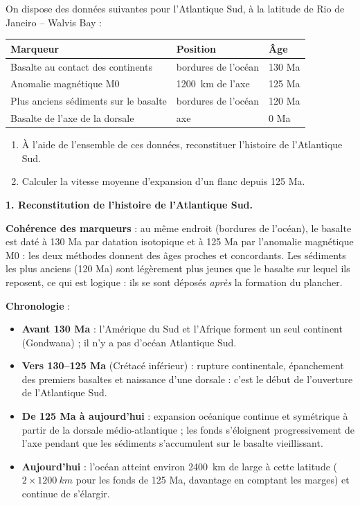 \documentclass[11pt]{article}
\newcommand{\cle}[1]{{\popxbold\color{popdark}#1}}
\begin{document}
\begin{exoresolu}
On dispose des données suivantes pour l'Atlantique Sud, à la latitude de Rio de Janeiro -- Walvis Bay :

\begin{center}
\begin{tabularx}{\linewidth}{|l|X|X|}
\hline
\rowcolor{popblueL} \textbf{Marqueur} & \textbf{Position} & \textbf{Âge} \\
\hline
Basalte au contact des continents & bordures de l'océan & 130 Ma \\
\hline
Anomalie magnétique M0 & \SI{1200}{km} de l'axe & 125 Ma \\
\hline
Plus anciens sédiments sur le basalte & bordures de l'océan & 120 Ma \\
\hline
Basalte de l'axe de la dorsale & axe & 0 Ma \\
\hline
\end{tabularx}
\end{center}

\begin{enumerate}
\item À l'aide de l'ensemble de ces données, reconstituer l'histoire de l'Atlantique Sud.
\item Calculer la vitesse moyenne d'expansion d'un flanc depuis 125 Ma.
\end{enumerate}
\tcblower
\textbf{1. Reconstitution de l'histoire de l'Atlantique Sud.}

\textbf{Cohérence des marqueurs} : au même endroit (bordures de l'océan), le basalte est daté à 130 Ma par datation isotopique et à 125 Ma par l'anomalie magnétique M0 : les deux méthodes donnent des âges proches et concordants. Les sédiments les plus anciens (120 Ma) sont légèrement plus jeunes que le basalte sur lequel ils reposent, ce qui est logique : ils se sont déposés \emph{après} la formation du plancher.

\textbf{Chronologie} :
\begin{itemize}
\item \textbf{Avant 130 Ma} : l'Amérique du Sud et l'Afrique forment un seul continent (Gondwana) ; il n'y a pas d'océan Atlantique Sud.
\item \textbf{Vers 130--125 Ma} (Crétacé inférieur) : rupture continentale, épanchement des premiers basaltes et naissance d'une dorsale : c'est le \cle{début de l'ouverture} de l'Atlantique Sud.
\item \textbf{De 125 Ma à aujourd'hui} : expansion océanique continue et symétrique à partir de la dorsale médio-atlantique ; les fonds s'éloignent progressivement de l'axe pendant que les sédiments s'accumulent sur le basalte vieillissant.
\item \textbf{Aujourd'hui} : l'océan atteint environ \SI{2400}{km} de large à cette latitude ($2 \times \SI{1200}{km}$ pour les fonds de 125 Ma, davantage en comptant les marges) et continue de s'élargir.
\end{itemize}


\end{exoresolu}
\end{document}
